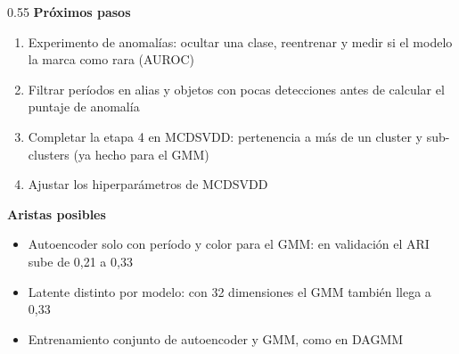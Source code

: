 \begin{frame}
\begin{columns}[T]
\begin{column}{0.55\textwidth}
{\small \textbf{Próximos pasos}}
\vspace{0.1em}
{\footnotesize
\begin{enumerate}\itemsep=3pt
\item Experimento de anomalías: ocultar una clase, reentrenar y medir si el modelo la marca
  como rara (AUROC)
\item Filtrar períodos en alias y objetos con pocas detecciones antes de calcular el puntaje
  de anomalía
\item Completar la etapa 4 en MCDSVDD: pertenencia a más de un cluster y sub-clusters (ya
  hecho para el GMM)
\item Ajustar los hiperparámetros de MCDSVDD
\end{enumerate}
}
\vspace{0.2em}
{\small \textbf{Aristas posibles}}
\vspace{0.1em}
{\footnotesize
\begin{itemize}\itemsep=2pt
\item Autoencoder solo con período y color para el GMM: en validación el ARI sube de 0,21 a
  0,33
\item Latente distinto por modelo: con 32 dimensiones el GMM también llega a 0,33
\item Entrenamiento conjunto de autoencoder y GMM, como en DAGMM
\end{itemize}
}
\end{column}
\end{columns}
\end{frame}
